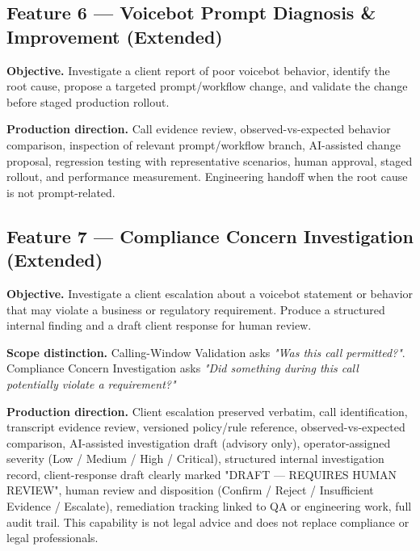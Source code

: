 \documentclass[11pt,a4paper]{article}
\begin{document}
\subsection{Feature 6 — Voicebot Prompt Diagnosis \& Improvement \textnormal{(Extended)}}

\textbf{Objective.} Investigate a client report of poor voicebot behavior, identify the root cause, propose a targeted prompt/workflow change, and validate the change before staged production rollout.

\textbf{Production direction.} Call evidence review, observed-vs-expected behavior comparison, inspection of relevant prompt/workflow branch, AI-assisted change proposal, regression testing with representative scenarios, human approval, staged rollout, and performance measurement. Engineering handoff when the root cause is not prompt-related.

\subsection{Feature 7 — Compliance Concern Investigation \textnormal{(Extended)}}

\textbf{Objective.} Investigate a client escalation about a voicebot statement or behavior that may violate a business or regulatory requirement. Produce a structured internal finding and a draft client response for human review.

\textbf{Scope distinction.} Calling-Window Validation asks \emph{"Was this call permitted?"}. Compliance Concern Investigation asks \emph{"Did something during this call potentially violate a requirement?"}

\textbf{Production direction.} Client escalation preserved verbatim, call identification, transcript evidence review, versioned policy/rule reference, observed-vs-expected comparison, AI-assisted investigation draft (advisory only), operator-assigned severity (Low / Medium / High / Critical), structured internal investigation record, client-response draft clearly marked "DRAFT — REQUIRES HUMAN REVIEW", human review and disposition (Confirm / Reject / Insufficient Evidence / Escalate), remediation tracking linked to QA or engineering work, full audit trail. This capability is not legal advice and does not replace compliance or legal professionals.

\end{document}
